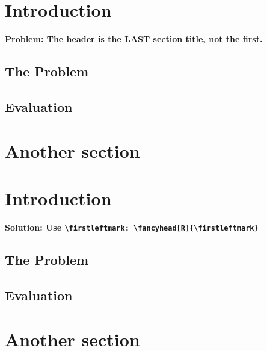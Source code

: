 \documentclass{article}
\begin{document}
\section{Introduction}

\textbf{Problem: The header  is the LAST section title, not the first.}

\subsection{The Problem}
\label{sec:problem}

\lipsum[1]

\subsection{Evaluation}

\lipsum[2]

\section{Another section}

\newpage
\fancyhead[R]{\firstleftmark}

\section{Introduction}

{\bfseries Solution: Use \verb+\firstleftmark+\verb+: \fancyhead[R]{\firstleftmark}+}

\subsection{The Problem}
\label{sec:problem}

\lipsum[1]

\subsection{Evaluation}

\lipsum[2]

\section{Another section}

\lipsum
\end{document}
